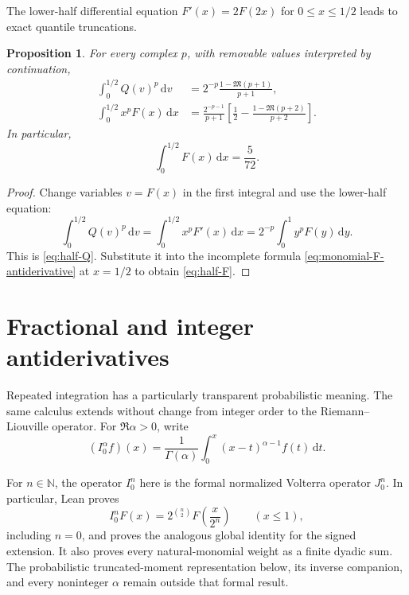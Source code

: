 \documentclass[11pt,oneside]{article}
\newtheorem{proposition}[theorem]{Proposition}
\theoremstyle{definition}
\newcommand{\F}{F}
\newcommand{\Q}{Q}
\newcommand{\M}{\mathfrak M}
\newcommand{\N}{\mathbb N}
\newcommand{\dd}{\,\mathrm d}
\begin{document}
The lower-half differential equation \(\F'(x)=2\F(2x)\) for \(0\le x\le1/2\)
leads to exact quantile truncations.

\begin{proposition}\label{prop:half-identities}
For every complex \(p\), with removable values interpreted by continuation,
\begin{align}
 \int_0^{1/2}\Q(v)^p\dd v
 &=2^{-p}\frac{1-\M(p+1)}{p+1},
 \label{eq:half-Q}\\
 \int_0^{1/2}x^p\F(x)\dd x
 &=\frac{2^{-p-1}}{p+1}
 \left[\frac12-\frac{1-\M(p+2)}{p+2}\right].
 \label{eq:half-F}
\end{align}
In particular,
\begin{equation}\label{eq:half-F-zero}
 \int_0^{1/2}\F(x)\dd x=\frac5{72}.
\end{equation}
\end{proposition}

\begin{proof}
Change variables \(v=\F(x)\) in the first integral and use the lower-half equation:
\[
 \int_0^{1/2}\Q(v)^p\dd v
 =\int_0^{1/2}x^p\F'(x)\dd x
 =2^{-p}\int_0^1y^p\F(y)\dd y.
\]
This is \cref{eq:half-Q}.  Substitute it into the incomplete formula
\cref{eq:monomial-F-antiderivative} at \(x=1/2\) to obtain \cref{eq:half-F}.
\end{proof}

\section{Fractional and integer antiderivatives}

Repeated integration has a particularly transparent probabilistic meaning.  The same
calculus extends without change from integer order to the Riemann--Liouville operator.
For \(\Re\alpha>0\), write
\begin{equation}\label{eq:RLdef}
 (I_0^\alpha f)(x)
 =\frac1{\Gamma(\alpha)}\int_0^x(x-t)^{\alpha-1}f(t)\dd t.
\end{equation}

\begin{statusbox}
For \(n\in\N\), the operator \(I_0^n\) here is the formal normalized Volterra operator
\(J_0^n\).  In particular, Lean proves
\[
 I_0^n\F(x)=2^{\binom n2}\F\!\left(\frac{x}{2^n}\right)
 \qquad(x\le1),
\]
including \(n=0\), and proves the analogous global identity for the signed extension.
It also proves every natural-monomial weight as a finite dyadic sum.  The probabilistic
truncated-moment representation below, its inverse companion, and every noninteger
\(\alpha\) remain outside that formal result.
\end{statusbox}
\end{document}
